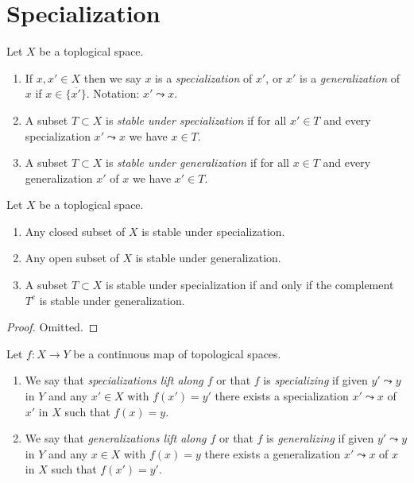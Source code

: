 \section{Specialization}
\label{section-specialization}

\begin{definition}
\label{definition-specialization}
Let $X$ be a toplogical space.
\begin{enumerate}
\item If $x, x' \in X$ then we say $x$ is a {\it specialization} of $x'$,
or $x'$ is a {\it generalization} of $x$ if $x \in \overline{\{x'\}}$.
Notation: $x' \leadsto x$.
\item A subset $T \subset X$ is {\it stable under specialization}
if for all $x' \in T$ and every specialization $x' \leadsto x$ we have
$x \in T$.
\item A subset $T \subset X$ is {\it stable under generalization}
if for all $x \in T$ and every generalization $x'$ of $x$ we have
$x' \in T$.
\end{enumerate}
\end{definition}

\begin{lemma}
\label{lemma-open-closed-specialization}
Let $X$ be a toplogical space.
\begin{enumerate}
\item Any closed subset of $X$ is stable under specialization.
\item Any open subset of $X$ is stable under generalization.
\item A subset $T \subset X$ is stable under specialization
if and only if
the complement $T^c$ is stable under generalization.
\end{enumerate}
\end{lemma}

\begin{proof}
Omitted.
\end{proof}

\begin{definition}
\label{definition-lift-specializations}
Let $f : X \to Y$ be a continuous map of topological spaces.
\begin{enumerate}
\item We say that {\it specializations lift along $f$} or that $f$ is
{\it specializing} if given $y' \leadsto y$ in $Y$ and any $x'\in X$ with
$f(x') = y'$ there exists a specialization $x' \leadsto x$ of $x'$ in $X$ such
that $f(x) = y$.
\item We say that {\it generalizations lift along $f$} or that $f$ is
{\it generalizing} if given $y' \leadsto y$ in $Y$ and any $x\in X$ with
$f(x) = y$ there exists a generalization $x' \leadsto x$ of $x$ in $X$ such
that $f(x') = y'$.
\end{enumerate}
\end{definition}

